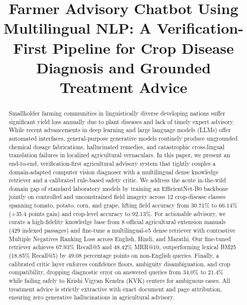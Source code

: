 \documentclass[conference]{IEEEtran}
\begin{document}
\title{Farmer Advisory Chatbot Using Multilingual NLP: A Verification-First Pipeline for Crop Disease Diagnosis and Grounded Treatment Advice}

\author{
}

\maketitle

\begin{abstract}
Smallholder farming communities in linguistically diverse developing nations suffer significant yield loss annually due to plant diseases and lack of timely expert advisory. While recent advancements in deep learning and large language models (LLMs) offer automated interfaces, general-purpose generative models routinely produce ungrounded chemical dosage fabrications, hallucinated remedies, and catastrophic cross-lingual translation failures in localized agricultural vernaculars. In this paper, we present an end-to-end, verification-first agricultural advisory system that tightly couples a domain-adapted computer vision diagnoser with a multilingual dense knowledge retriever and a calibrated rule-based safety critic. We address the acute in-the-wild domain gap of standard laboratory models by training an EfficientNet-B0 backbone jointly on controlled and unconstrained field imagery across 12 crop-disease classes spanning tomato, potato, corn, and grape, lifting field accuracy from 30.71\% to 66.14\% (+35.4 points gain) and crop-level accuracy to 92.13\%. For actionable advisory, we curate a high-fidelity knowledge base from 8 official agricultural extension manuals (429 indexed passages) and fine-tune a multilingual-e5 dense retriever with contrastive Multiple Negatives Ranking Loss across English, Hindi, and Marathi. Our fine-tuned retriever achieves 67.93\% Recall@5 and 48.42\% MRR@10, outperforming lexical BM25 (18.85\% Recall@5) by 49.08 percentage points on non-English queries. Finally, a calibrated critic layer enforces confidence floors, ambiguity disambiguation, and crop compatibility, dropping diagnostic error on answered queries from 34.0\% to 21.4\% while failing safely to Krishi Vigyan Kendra (KVK) centers for ambiguous cases. All treatment advice is strictly extractive with exact document and page attribution, ensuring zero generative hallucinations in agricultural advisory.
\end{abstract}
\end{document}
